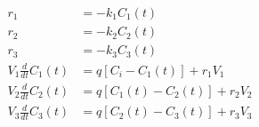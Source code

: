 \begin{equation}
  \begin{aligned}
    r_1                    & = - k_1 C_1(t)
    \\
    r_2                    & = - k_2 C_2(t)
    \\
    r_3                    & = - k_3 C_3(t)
    \\
    V_1 \frac{d}{dt}C_1(t) & = q [C_i - C_1(t)] + r_1 V_1
    \\
    V_2 \frac{d}{dt}C_2(t) & = q [C_1(t) - C_2(t)] + r_2 V_2
    \\
    V_3 \frac{d}{dt}C_3(t) & = q [C_2(t) - C_3(t)] + r_3 V_3
  \end{aligned}
  \label{eq:three_stirred_tank01_2}
\end{equation}